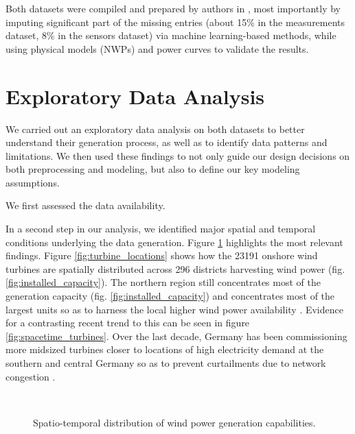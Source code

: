 Both datasets were compiled and prepared by authors in \cite{becker2017completion}, most importantly by imputing significant part of the missing entries (about 15\% in the measurements dataset, 8\% in the sensors dataset) via machine learning-based methods, while using physical models (NWPs) and power curves to validate the results.

\section{Exploratory Data Analysis}\label{sec:eda}
We carried out an exploratory data analysis on both datasets to better understand their generation process, as well as to identify data patterns and limitations.
We then used these findings to not only guide our design decisions on both preprocessing and modeling, but also to define our key modeling assumptions.

We first assessed the data availability.

In a second step in our analysis, we identified major spatial and temporal conditions underlying the data generation.
Figure \ref{fig:germany_maps} highlights the most relevant findings.
Figure \ref{fig:turbine_locations} shows how the 23191 onshore wind turbines are spatially distributed across 296 districts harvesting wind power (fig. \ref{fig:installed_capacity}).
The northern region still concentrates most of the generation capacity (fig. \ref{fig:installed_capacity}) and concentrates most of the largest units so as to harness the local higher wind power availability \cite{windatlas}.
Evidence for a contrasting recent trend to this can be seen in figure \ref{fig:spacetime_turbines}.
Over the last decade, Germany has been commissioning more midsized turbines closer to locations of high electricity demand at the southern and central Germany so as to prevent curtailments due to network congestion \cite{engeland2017variability}.

\begin{figure}[H]%
    \centering
    \caption{Spatio-temporal distribution of wind power generation capabilities.}
    \label{fig:germany_maps}
    \\
\end{figure}


